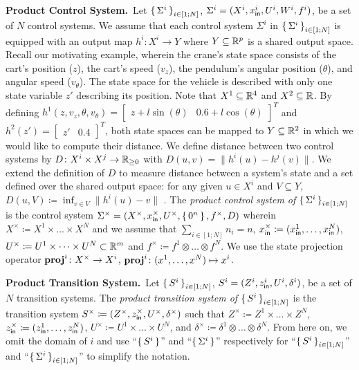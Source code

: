 \smallskip
\noindent\textbf{Product Control System.}\
Let $\set{\Sigma^i}_{i\in [1;N]}$, $\Sigma^i=(X^i,x_{\mathsf{in}}^i,U^i,W^i,f^i)$, be a set of $N$ control systems. 
We assume that each control system $\Sigma^i$ in $\set{\Sigma^i}_{i\in [1;N]}$ is equipped with an output map $h^i\colon X^i\rightarrow Y$ where $Y\subseteq\mathbb{R}^p$ is a shared output space. Recall our motivating example, wherein the crane's state space consists of the cart's position ($z$), the cart's speed ($v_z$), the pendulum's angular position ($\theta$), and angular speed ($v_\theta$). The state space for the vehicle is described with only one state variable $z'$ describing its position. Note that $X^1\subseteq \mathbb{R}^4$ and $X^2\subseteq \mathbb{R}$. By defining $h^1(z,v_z,\theta,v_\theta)=\begin{bmatrix}z+l\sin(\theta)&0.6+l\cos(\theta)\end{bmatrix}^T$ and $h^2(z')=\begin{bmatrix}z'&0.4\end{bmatrix}^T$, both state spaces can be mapped to $Y\subseteq \mathbb{R}^2$ in which we would like to compute their distance.
We define distance between two control systems by $D\colon X^i\times X^j\rightarrow \mathbb{R}_{\geq 0}$ with $D(u,v) = \| h^i(u)-h^j(v)\|$. We extend the definition of $D$ to measure distance between a system's state and a set defined over the shared output space: for any given $u\in X^i$ and $V\subseteq Y$, $D(u,V) \coloneqq \inf_{v\in V}\|h^i(u)-v\|$ .
The \emph{product control system of } $\set{\Sigma^i}_{i\in [1;N]}$ is the control system $\Sigma^\times = (X^\times, x_{\mathsf{in}}^\times, U^\times, \set{0^n}, f^\times, D)$ \Sadegh{why do you have $D$?} wherein $X^\times\coloneqq X^1\times \ldots \times X^N$ and we assume that $\sum_{i\in [1;N]} n_i=n$, $x_{\mathsf{in}}^\times\coloneqq (x_{\mathsf{in}}^1,\ldots,x_{\mathsf{in}}^N)$, $U^\times\coloneqq U^1\times\dots\times U^N\subset \mathbb{R}^m$ and $f^\times\coloneqq f^{1}\otimes \ldots\otimes f^{N}$. 
We use the state projection operator $\mathbf{proj}^{i}\colon X^\times\to X^i$, $\mathbf{proj}^{i}\colon (x^1,\ldots,x^N)\mapsto x^i$. %

\smallskip
\noindent\textbf{Product Transition System.}\
Let $\set{S^i}_{i\in [1;N]}$, $S^i=(Z^i,z_{\mathsf{in}}^i,U^i,\delta^i)$, be a set of $N$ transition systems.
The \emph{product transition system of } $\set{S^i}_{i\in [1;N]}$ is the transition system $S^\times \coloneqq (Z^\times, z_{\mathsf{in}}^\times, U^\times, \delta^\times)$ such that $Z^\times \coloneqq Z^1\times \ldots \times Z^N$, $z^\times_{\mathsf{in}}\coloneqq (z_{\mathsf{in}}^1,\ldots,z_{\mathsf{in}}^N)$, $U^\times \coloneqq U^1\times \ldots\times U^N$, and $\delta^\times \coloneqq \delta^1\otimes\ldots \otimes \delta^N$.
From here on, we omit the domain of $i$ and use ``$\set{S^i}$'' and ``$\set{\Sigma^i}$'' respectively for ``$\set{S^i}_{i\in [1;N]}$'' and ``$\set{\Sigma^i}_{i\in [1;N]}$'' to simplify the notation.

